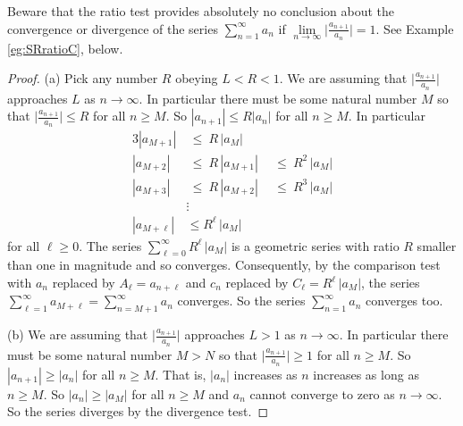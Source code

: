 \begin{warning}
Beware that the ratio test provides absolutely no conclusion about the
convergence or divergence of the series $\sum\limits_{n=1}^\infty a_n$
if $\lim\limits_{n\rightarrow\infty}\Big|\frac{a_{n+1}}{a_n}\Big| =  1$.
See Example \ref{eg:SRratioC}, below.
\end{warning}

\begin{proof}
(a) Pick any number $R$ obeying $L<R<1$. We are assuming that
$\Big|\frac{a_{n+1}}{a_n}\Big|$ approaches $L$ as $n\rightarrow\infty$.
In particular there must be some natural number $M$ so that
$\Big|\frac{a_{n+1}}{a_n}\Big|\le R$ for all $n\ge M$. So
$|a_{n+1}|\le R|a_n|$ for all $n\ge M$. In particular
\begin{alignat*}{3}
|a_{M+1}| & \ \le\  R\,|a_M| \\
|a_{M+2}| & \ \le\  R\,|a_{M+1}| &\ \ \le\  R^2 \,|a_M| \\
|a_{M+3}| & \ \le\  R\,|a_{M+2}| &\ \ \le\  R^3 \,|a_M| \\
&\vdots \\
|a_{M+\ell}| &\le R^\ell \,|a_M|
\end{alignat*}
for all $\ell\ge 0$. The series $\sum_{\ell=0}^\infty  R^\ell \,|a_M|$
is a geometric series with ratio $R$ smaller than one in magnitude and
so converges. Consequently, by the comparison test with $a_n$ replaced
by $A_\ell = a_{n+\ell}$ and $c_n$ replaced by $C_\ell= R^\ell \, |a_M|$,
the series $\sum\limits_{\ell=1}^\infty a_{M+\ell}
=\sum\limits_{n=M+1}^\infty a_n$ converges. So the series
$\sum\limits_{n=1}^\infty a_n$ converges too.

\noindent (b) We are assuming that
$\Big|\frac{a_{n+1}}{a_n}\Big|$ approaches $L>1$ as $n\rightarrow\infty$.
In particular there must be some natural number $M>N$ so that
$\Big|\frac{a_{n+1}}{a_n}\Big|\ge 1$ for all $n\ge M$. So
$|a_{n+1}|\ge |a_n|$ for all $n\ge M$. That is, $|a_n|$ increases as $n$
increases as long as $n\ge M$. So $|a_n|\ge |a_M|$ for all $n\ge M$
and $a_n$ cannot converge to zero as $n\rightarrow\infty$. So the series
diverges by the divergence test.

\end{proof}


